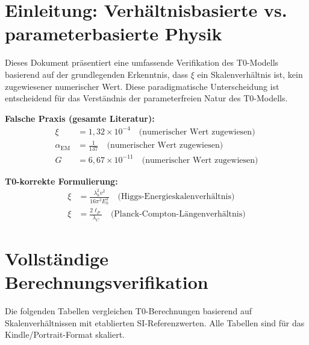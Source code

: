 \section{Einleitung: Verhältnisbasierte vs. parameterbasierte Physik}
	
	Dieses Dokument präsentiert eine umfassende Verifikation des T0-Modells basierend auf der grundlegenden Erkenntnis, dass $\xi$ ein Skalenverhältnis ist, kein zugewiesener numerischer Wert. Diese paradigmatische Unterscheidung ist entscheidend für das Verständnis der parameterfreien Natur des T0-Modells.
	
	\begin{tcolorbox}[colback=red!5!white,colframe=red!75!black,title=Grundlegender Literaturfehler]
		\textbf{Falsche Praxis (gesamte Literatur):}
		\begin{align}
			\xi &= 1,32 \times 10^{-4} \quad \text{(numerischer Wert zugewiesen)} \\
			\alpha_{\text{EM}} &= \frac{1}{137} \quad \text{(numerischer Wert zugewiesen)} \\
			G &= 6,67 \times 10^{-11} \quad \text{(numerischer Wert zugewiesen)}
		\end{align}
		
		\textbf{T0-korrekte Formulierung:}
		\begin{align}
			\xi &= \frac{\lambda_h^2 v^2}{16\pi^3 E_h^2} \quad \text{(Higgs-Energieskalenverhältnis)} \\
			\xi &= \frac{2\ell_P}{\lambda_C} \quad \text{(Planck-Compton-Längenverhältnis)}
		\end{align}
	\end{tcolorbox}
	
	\section{Vollständige Berechnungsverifikation}
	
	Die folgenden Tabellen vergleichen T0-Berechnungen basierend auf Skalenverhältnissen mit etablierten SI-Referenzwerten. Alle Tabellen sind für das Kindle/Portrait-Format skaliert.
	
